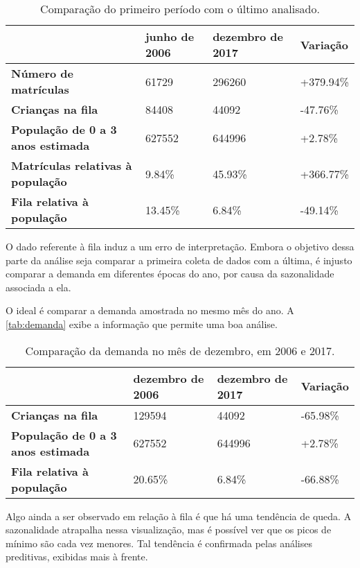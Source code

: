 \begin{table}[H]
	\begin{tabular}{l|l|l|l}
		\textbf{}                                 & \textbf{junho de 2006} & \textbf{dezembro de 2017} & \textbf{Variação} \\ \hline
		\textbf{Número de matrículas}             & 61729                  & 296260                    & +379.94\%       \\ \hline
		\textbf{Crianças na fila}                 & 84408                  & 44092                     & -47.76\%        \\ \hline
		\textbf{População de 0 a 3 anos estimada} & 627552                 & 644996                    & +2.78\%         \\ \hline
		\textbf{Matrículas relativas à população} & 9.84\%              & 45.93\%               & +366.77\%       \\ \hline
		\textbf{Fila relativa à população}        & 13.45\%             & 6.84\%                 & -49.14\%        \\
	\end{tabular}
	\caption{Comparação do primeiro período com o último analisado.}
	\label{tab:saopaulo}
\end{table}

O dado referente à fila induz a um erro de interpretação. Embora o objetivo dessa parte da análise seja comparar a primeira coleta de dados com a última, é injusto comparar a demanda em diferentes épocas do ano, por causa da sazonalidade associada a ela.

O ideal é comparar a demanda amostrada no mesmo mês do ano. A \autoref{tab:demanda} exibe a informação que permite uma boa análise.

\begin{table}[H]
	\begin{tabular}{l|l|l|l}
		\textbf{}                                 & \textbf{dezembro de 2006} & \textbf{dezembro de 2017} & \textbf{Variação} \\ \hline
		\textbf{Crianças na fila}                 & 129594                    & 44092                     & -65.98\%       \\ \hline
		\textbf{População de 0 a 3 anos estimada} & 627552                    & 644996                    & +2.78\%        \\ \hline
		\textbf{Fila relativa à população}        & 20.65\%               & 6.84\%                  & -66.88\%        \\ 
	\end{tabular}
	\caption{Comparação da demanda no mês de dezembro, em 2006 e 2017.}
	\label{tab:demanda}
\end{table}

Algo ainda a ser observado em relação à fila é que há uma tendência de queda. A sazonalidade atrapalha nessa visualização, mas é possível ver que os picos de mínimo são cada vez menores. Tal tendência é confirmada pelas análises preditivas, exibidas mais à frente.